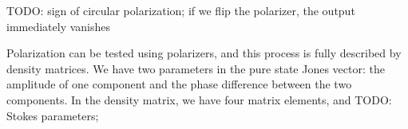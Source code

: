 \documentclass[hyperref, a4paper]{article}
\begin{document}
TODO: sign of circular polarization; if we flip the polarizer,
the output immediately vanishes

Polarization can be tested using polarizers, 
and this process is fully described by density matrices. 
We have two parameters in the pure state Jones vector:
the amplitude of one component 
and the phase difference between the two components.
In the density matrix, 
we have four matrix elements, 
and TODO: Stokes parameters; 
\end{document}
